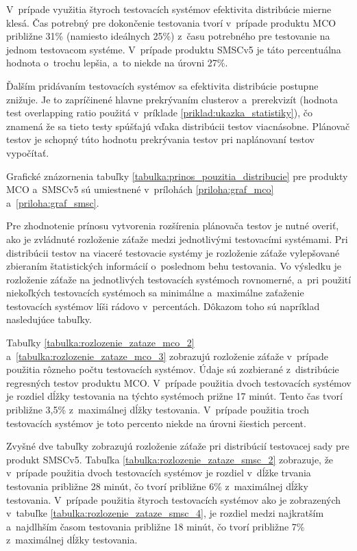 V~prípade využitia štyroch testovacích systémov efektivita distribúcie 
mierne klesá. Čas potrebný pre dokončenie testovania tvorí 
v~prípade produktu MCO približne 31\% (namiesto ideálnych 25\%) 
z~času potrebného pre testovanie na jednom testovacom systéme.
V~prípade produktu SMSCv5 je táto percentuálna hodnota o~trochu 
lepšia, a~to niekde na úrovni 27\%.

Ďalším pridávaním testovacích systémov sa efektivita distribúcie 
postupne znižuje. Je to zapríčinené hlavne prekrývaním clusterov 
a~prerekvizít (hodnota test overlapping ratio použitá v~príklade 
\ref{priklad:ukazka_statistiky}), čo znamená že sa tieto testy spúšťajú 
vďaka distribúcii testov viacnásobne. Plánovač testov je schopný túto 
hodnotu prekrývania testov pri naplánovaní testov vypočítať.

Grafické znázornenia tabuľky \ref{tabulka:prinos_pouzitia_distribucie}
pre produkty MCO a~SMSCv5 sú umiestnené v~prílohách 
\ref{priloha:graf_mco} a~\ref{priloha:graf_smsc}.

Pre zhodnotenie prínosu vytvorenia rozšírenia plánovača testov je nutné
overiť, ako je zvládnuté rozloženie záťaže medzi jednotlivými testovacími
systémami. Pri distribúcii testov na viaceré testovacie systémy je 
rozloženie záťaže vylepšované zbieraním štatistických informácií o~poslednom
behu testovania. 
Vo výsledku je rozloženie záťaže na jednotlivých testovacích systémoch
rovnomerné, a~pri použití niekoľkých testovacích systémoch sa 
minimálne a~maximálne zaťaženie testovacích systémov líši rádovo v~percentách.
Dôkazom toho sú napríklad nasledujúce tabuľky. 

Tabuľky \ref{tabulka:rozlozenie_zataze_mco_2} a~\ref{tabulka:rozlozenie_zataze_mco_3} 
zobrazujú rozloženie záťaže v~prípade
použitia rôzneho počtu testovacích systémov. Údaje sú zozbierané
z~distribúcie regresných testov produktu MCO. V~prípade použitia
dvoch testovacích systémov je rozdiel dĺžky testovania na týchto systémoch
prižne 17 minút. Tento čas tvorí približne 3,5\% z~maximálnej dĺžky testovania.
V~prípade použitia troch testovacích systémov je toto percento niekde 
na úrovni šiestich percent.
 
Zvyšné dve tabuľky zobrazujú rozloženie záťaže pri distribúcií testovacej
sady pre produkt SMSCv5. Tabuľka \ref{tabulka:rozlozenie_zataze_smsc_2} 
zobrazuje, že v~prípade použitia dvoch testovacích systémov je rozdiel
v~dĺžke trvania testovania približne 28 minút, čo tvorí približne 6\%
z~maximálnej dĺžky testovania. V~prípade použitia štyroch
testovacích systémov ako je zobrazených v~tabuľke \ref{tabulka:rozlozenie_zataze_smsc_4},
je rozdiel medzi najkratším a~najdlhším časom testovania približne 18 minút, čo
tvorí približne 7\% z~maximálnej dĺžky testovania.



